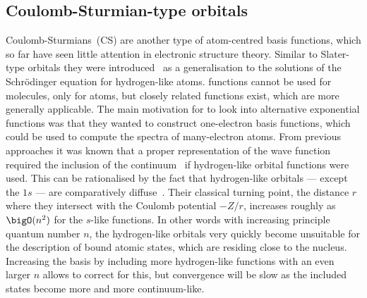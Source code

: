 \subsection{Coulomb-Sturmian-type orbitals}
\label{sec:BasisCS}
Coulomb-Sturmians~(CS) are another type of atom-centred basis functions,
which so far have seen little attention in electronic structure theory.
Similar to Slater-type orbitals
they were introduced~\cite{Shull1959}
as a generalisation to the solutions of the Schrödinger equation for hydrogen-like atoms.
\CS functions cannot be used for molecules, only for atoms,
but closely related functions exist,
which are more generally applicable.
The main motivation for \citet{Shull1959} to look into alternative
exponential functions was that they wanted to construct one-electron basis functions,
which could be used to compute the spectra of many-electron atoms.
From previous approaches it was known that a
proper representation of the wave function
required the inclusion of the continuum~\cite{Avery2006}
if hydrogen-like orbital functions were used.
This can be rationalised by the fact that hydrogen-like orbitals
--- except the $1s$ --- are comparatively diffuse~\cite{Avery2008}.
Their classical turning point,
\ie the distance $r$ where they intersect with the Coulomb potential $-Z/r$,
increases roughly as $\bigO(n^2)$ for the $s$-like functions.
In other words with increasing principle quantum number $n$,
the hydrogen-like orbitals very quickly become unsuitable for the
description of bound atomic states,
which are residing close to the nucleus.
Increasing the basis by including more hydrogen-like functions
with an even larger $n$ allows to correct for this,
but convergence will be slow as the included states become
more and more continuum-like.

